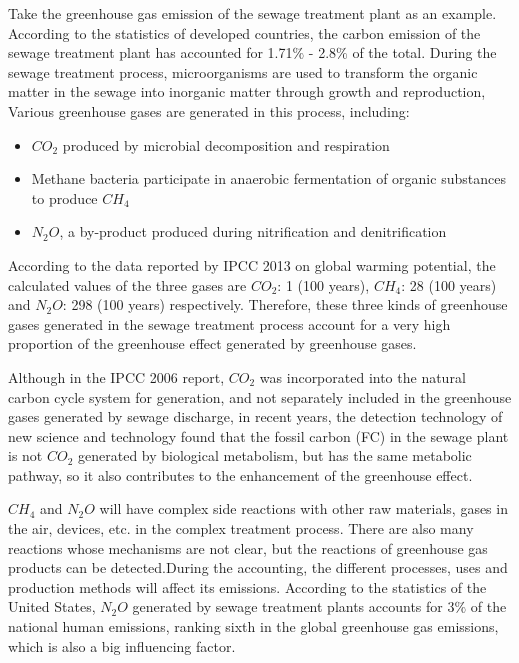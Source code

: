 \documentclass{apmcmthesis}
\begin{document}
Take the greenhouse gas emission of the sewage treatment plant as an example. According to the statistics of developed countries, the carbon emission of the sewage treatment plant has accounted for 1.71$\%$ - 2.8$\%$ of the total\cite{104}. During the sewage treatment process, microorganisms are used to transform the organic matter in the sewage into inorganic matter through growth and reproduction, Various greenhouse gases are generated in this process, including:

\begin{itemize}
  \item $CO_2$ produced by microbial decomposition and respiration
  \item Methane bacteria participate in anaerobic fermentation of organic substances to produce $CH_4$
  \item $N_2O$, a by-product produced during nitrification and denitrification
\end{itemize}

According to the data reported by IPCC 2013\cite{105} on global warming potential, the calculated values of the three gases are $CO_2$: 1 (100 years), $CH_4$: 28 (100 years) and $N_2O$: 298 (100 years) respectively. Therefore, these three kinds of greenhouse gases generated in the sewage treatment process account for a very high proportion of the greenhouse effect generated by greenhouse gases.

Although in the IPCC 2006\cite{106}\cite{107} report, $CO_2$ was incorporated into the natural carbon cycle system for generation, and not separately included in the greenhouse gases generated by sewage discharge, in recent years, the detection technology of new science and technology found that the fossil carbon (FC) in the sewage plant is not $CO_2$ generated by biological metabolism, but has the same metabolic pathway, so it also contributes to the enhancement of the greenhouse effect.

$CH_4$ and $N_2O$ will have complex side reactions with other raw materials, gases in the air, devices, etc. in the complex treatment process. There are also many reactions whose mechanisms are not clear, but the reactions of greenhouse gas products can be detected.During the accounting, the different processes, uses and production methods will affect its emissions. According to the statistics of the United States, $N_2O$ generated by sewage treatment plants accounts for 3$\%$ of the national human emissions\cite{108}, ranking sixth in the global greenhouse gas emissions, which is also a big influencing factor.
\end{document}
